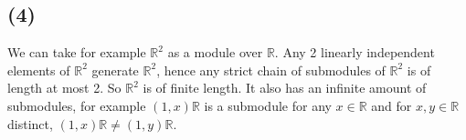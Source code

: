 \documentclass{article}
\newcommand{\R}{\mathbb{R}}
\begin{document}
\subsection*{(4)}

We can take for example $\R^2$ as a module over $\R$.
Any 2 linearly independent elements of $\R^2$ generate $\R^2$, hence
any strict chain of submodules of $\R^2$ is of length at most 2.
So $\R^2$ is of finite length. It also has an infinite amount of
submodules, for example $(1, x)\R$ is a submodule for any $x \in \R$
and for $x, y \in \R$ distinct, $(1, x)\R \neq (1, y)\R$.
\end{document}
